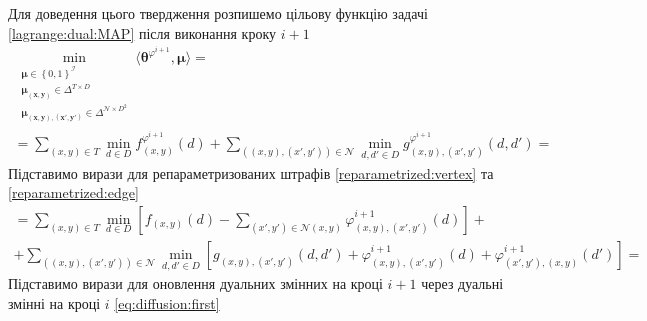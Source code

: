 Для доведення цього твердження розпишемо цільову функцію задачі
\eqref{lagrange:dual:MAP} після виконання кроку $i + 1$
\begin{equation*}
\begin{gathered}
    \min \limits_{\substack{\pmb{\mu} \in \left\{ 0, 1 \right\}^{\mathcal{I}} \\
                            \pmb{\mu_{\left(x, y \right)}} \in \Delta^{T \times D} \\
                            \pmb{\mu_{\left(x, y \right), \left(x', y' \right)}} \in
                                \Delta^{\mathcal{N} \times D^2}}}
        \langle \pmb{\theta}^{\varphi^{i + 1}}, \pmb{\mu} \rangle = \\
    = \sum \limits_{\left(x, y \right) \in T}
        \min \limits_{d \in D}
            f_{\left(x, y \right)}^{\varphi^{i + 1}} \left( d \right) +
    \sum \limits_{\left( \left(x, y \right), \left(x', y' \right) \right) \in \mathcal{N}}
        \min \limits_{d, d' \in D}
            g_{\left(x, y \right), \left(x', y' \right)}^{\varphi^{i + 1}}
                \left( d, d' \right) =
\end{gathered}
\end{equation*}
Підставимо вирази для репараметризованих штрафів \eqref{reparametrized:vertex}
та \eqref{reparametrized:edge}
\begin{equation*}
\begin{gathered}
    = \sum \limits_{\left(x, y \right) \in T}
        \min \limits_{d \in D} \left[
            f_{\left(x, y \right)} \left( d \right) -
            \sum \limits_{\left(x', y' \right) \in \mathcal{N} \left(x, y \right)}
                \varphi_{\left(x, y \right), \left(x', y' \right)}^{i + 1}
                    \left( d \right)
        \right] + \\
    + \sum \limits_{\left(\left(x, y \right), \left(x', y' \right) \right) \in \mathcal{N}}
        \min \limits_{d, d' \in D} \left[
            g_{\left(x, y \right), \left(x', y' \right)} \left(d, d' \right) +
            \varphi_{\left(x, y \right), \left(x', y' \right)}^{i + 1}
                \left( d \right) +
            \varphi_{\left(x', y' \right), \left(x, y \right)}^{i + 1}
                \left( d' \right)
        \right] =
\end{gathered}
\end{equation*}
Підставимо вирази для оновлення дуальних змінних на кроці $i + 1$
через дуальні змінні на кроці $i$ \eqref{eq:diffusion:first}
